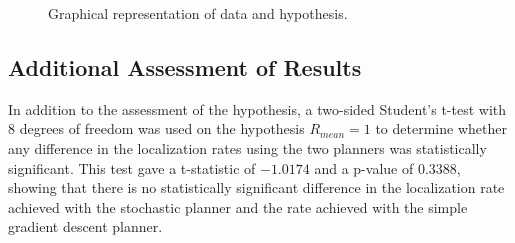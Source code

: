 \documentclass[submit]{aiaa-pretty-modified}
\begin{document}
\begin{figure}
\begin{center}
\caption{Graphical representation of data and hypothesis.}
\label{fig:killer}
\end{center}
\end{figure}


\subsection{Additional Assessment of Results}
\label{sec:additional}
In addition to the assessment of the hypothesis, a two-sided Student's
t-test with 8 degrees of freedom was used on the hypothesis $R_{mean}
= 1$ to determine whether any difference in the localization rates
using the two planners was statistically significant.  This test gave
a t-statistic of $-1.0174$ and a p-value of $0.3388$, showing that
there is no statistically significant difference in the localization
rate achieved with the stochastic planner and the rate achieved with
the simple gradient descent planner.
\end{document}
